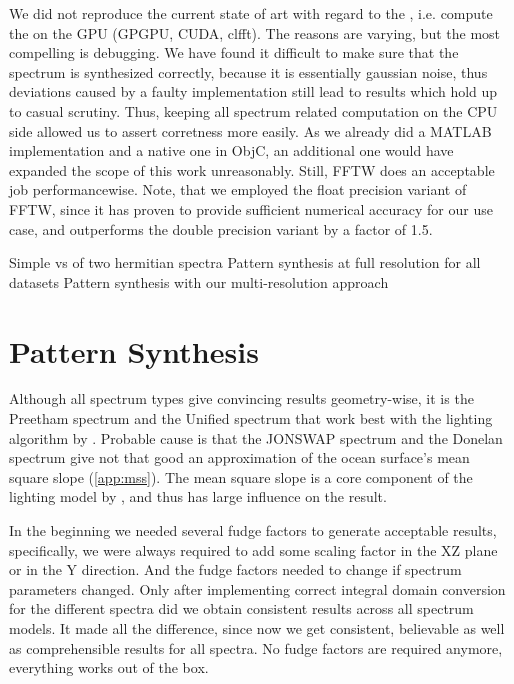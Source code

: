We did not reproduce the current state of art with regard to the \FourierTransform,
i.e. compute the \IDFT on the GPU (GPGPU, CUDA, clfft). The reasons are varying,
but the most compelling is debugging. We have found it difficult to make sure
that the spectrum is synthesized correctly, because it is essentially gaussian noise,
thus deviations caused by a faulty implementation still lead to results which hold
up to casual scrutiny. Thus, keeping all spectrum related computation on the
CPU side allowed us to assert corretness more easily.
As we already did a MATLAB implementation and a native one
in ObjC, an additional one would have expanded the scope of this work unreasonably.
Still, FFTW does an acceptable job performancewise. Note, that we employed the
float precision variant of FFTW, since it has proven to provide sufficient
numerical accuracy for our use case, and outperforms the double precision variant
by a factor of 1.5.

Simple \InvFourierTransform vs \InvFourierTransform of two hermitian spectra
Pattern synthesis at full resolution for all datasets
Pattern synthesis with our multi-resolution approach

\section{Pattern Synthesis}
\label{sec:results:synthesis}
Although all spectrum types give convincing results geometry-wise, it is the
Preetham spectrum and the Unified spectrum that work best with the lighting
algorithm by \cite{article:oceanlighting}. Probable cause is that the JONSWAP
spectrum and the Donelan spectrum give not that good an approximation of the
ocean surface's mean square slope (\ref{app:mss}). The mean square slope is a
core component of the lighting model by \cite{article:oceanlighting}, and thus
has large influence on the result.

In the beginning we needed several fudge factors to generate acceptable results,
specifically, we were always required to add some scaling factor in the XZ plane
or in the Y direction. And the fudge factors needed to change if spectrum
parameters changed.
Only after implementing correct integral domain conversion for the different
spectra did we obtain consistent results across all spectrum models. It made all
the difference, since now we get consistent, believable as well as
comprehensible results for all spectra. No fudge factors are required anymore,
everything works out of the box.

